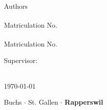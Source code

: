 \begin{titlepage}
	

	\center
	\vspace{2cm}
	{\color{OSTpurple}\fontsize{21}{20}{\textbf{\Title}}}\\
	\vspace{0.5cm}
	\color{black}
	{\fontsize{15}{20}{\textsf{\Subtitle}}}\\
	\vspace{3cm}
	

	
	\color{black}
	
	{\ModulInfo}\\
	{\Studiengang}\\
	{\Profile}\\
	{\Semester}\\

	\vspace{1.5cm}
	
	Authors\\
	
	{\textbf\AuthorA}\\
	{\small Matriculation No. \AuthorAMatrikel}\\
	
	\vspace{.5cm}
	{\textbf\AuthorB}\\
	{\small Matriculation No. \AuthorBMatrikel}\\




	\vspace{1.5cm}

	\color{black}



	\color{black}
	Supervisor:\\ \textbf{\Supervisor}\\
		
		


	\vspace{3.5cm}

  
	\titledate\today

	 
	 \vfill
	 \begin{flushright}
	 	\vfill
	 	\color{OSTpurple}\small\textsf{
	 		Buchs $ \cdot $ St. Gallen $ \cdot $ \textbf{Rapperswil}
	 	}
	 \end{flushright}
	



\end{titlepage}
